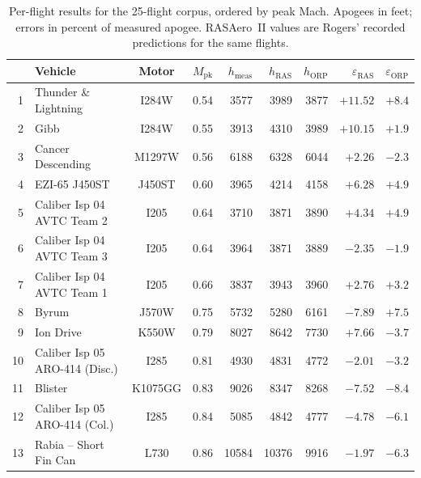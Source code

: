 \begin{table}[t]
  \centering
  \caption{Per-flight results for the \num{25}-flight corpus, ordered by peak
    Mach. Apogees in feet; errors in percent of measured apogee. RASAero~II
    values are Rogers' recorded predictions for the same flights.}
  \label{tab:corpus-perflight}
  \begin{tabular}{rlcrrrrrr}
    \toprule
    & Vehicle & Motor & $M_\text{pk}$
      & $h_\text{meas}$ & $h_\text{RAS}$ & $h_\text{ORP}$
      & $\varepsilon_\text{RAS}$ & $\varepsilon_\text{ORP}$ \\
    \midrule
    1  & Thunder \& Lightning            & I284W           & 0.54 & 3577   & 3989   & 3877   & $+11.52$ & $+8.4$  \\
    2  & Gibb                            & I284W           & 0.55 & 3913   & 4310   & 3989   & $+10.15$ & $+1.9$  \\
    3  & Cancer Descending               & M1297W          & 0.56 & 6188   & 6328   & 6044   & $+2.26$  & $-2.3$  \\
    4  & EZI-65 J450ST                   & J450ST          & 0.60 & 3965   & 4214   & 4158   & $+6.28$  & $+4.9$  \\
    5  & Caliber Isp 04 AVTC Team 2      & I205            & 0.64 & 3710   & 3871   & 3890   & $+4.34$  & $+4.9$  \\
    6  & Caliber Isp 04 AVTC Team 3      & I205            & 0.64 & 3964   & 3871   & 3889   & $-2.35$  & $-1.9$  \\
    7  & Caliber Isp 04 AVTC Team 1      & I205            & 0.66 & 3837   & 3943   & 3960   & $+2.76$  & $+3.2$  \\
    8  & Byrum                           & J570W           & 0.75 & 5732   & 5280   & 6161   & $-7.89$  & $+7.5$  \\
    9  & Ion Drive                       & K550W           & 0.79 & 8027   & 8642   & 7730   & $+7.66$  & $-3.7$  \\
    10 & Caliber Isp 05 ARO-414 (Disc.)  & I285            & 0.81 & 4930   & 4831   & 4772   & $-2.01$  & $-3.2$  \\
    11 & Blister                         & K1075GG         & 0.83 & 9026   & 8347   & 8268   & $-7.52$  & $-8.4$  \\
    12 & Caliber Isp 05 ARO-414 (Col.)   & I285            & 0.84 & 5085   & 4842   & 4777   & $-4.78$  & $-6.1$  \\
    13 & Rabia -- Short Fin Can          & L730            & 0.86 & 10584  & 10376  & 9916   & $-1.97$  & $-6.3$  \\

\end{tabular}
\end{table}
